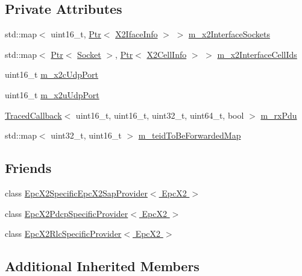 \subsection*{Private Attributes}
\begin{DoxyCompactItemize}
\item 
std\+::map$<$ uint16\+\_\+t, \hyperlink{classns3_1_1Ptr}{Ptr}$<$ \hyperlink{classns3_1_1X2IfaceInfo}{X2\+Iface\+Info} $>$ $>$ \hyperlink{classns3_1_1EpcX2_a0665276228b9b99a52ef6d5e9bdb306d}{m\+\_\+x2\+Interface\+Sockets}
\item 
std\+::map$<$ \hyperlink{classns3_1_1Ptr}{Ptr}$<$ \hyperlink{classns3_1_1Socket}{Socket} $>$, \hyperlink{classns3_1_1Ptr}{Ptr}$<$ \hyperlink{classns3_1_1X2CellInfo}{X2\+Cell\+Info} $>$ $>$ \hyperlink{classns3_1_1EpcX2_ac2a7cd7a712f47a9f429254842762482}{m\+\_\+x2\+Interface\+Cell\+Ids}
\item 
uint16\+\_\+t \hyperlink{classns3_1_1EpcX2_aa2fe730659f6fc10fcd8c44272f96dde}{m\+\_\+x2c\+Udp\+Port}
\item 
uint16\+\_\+t \hyperlink{classns3_1_1EpcX2_aa0e3b62bf699a12b65309cb25f232974}{m\+\_\+x2u\+Udp\+Port}
\item 
\hyperlink{classns3_1_1TracedCallback}{Traced\+Callback}$<$ uint16\+\_\+t, uint16\+\_\+t, uint32\+\_\+t, uint64\+\_\+t, bool $>$ \hyperlink{classns3_1_1EpcX2_a00f11080fe6a1d7020bfae006445eb59}{m\+\_\+rx\+Pdu}
\item 
std\+::map$<$ uint32\+\_\+t, uint16\+\_\+t $>$ \hyperlink{classns3_1_1EpcX2_a18b54cbbfdd1a869ce3c504274294ab6}{m\+\_\+teid\+To\+Be\+Forwarded\+Map}
\end{DoxyCompactItemize}
\subsection*{Friends}
\begin{DoxyCompactItemize}
\item 
class \hyperlink{classns3_1_1EpcX2_a5fa3eadb39e71e0c9f7a469a8315c690}{Epc\+X2\+Specific\+Epc\+X2\+Sap\+Provider$<$ Epc\+X2 $>$}
\item 
class \hyperlink{classns3_1_1EpcX2_a372bb6d7b4f9b08802172b6cf02ecd2d}{Epc\+X2\+Pdcp\+Specific\+Provider$<$ Epc\+X2 $>$}
\item 
class \hyperlink{classns3_1_1EpcX2_ad723f727ad6075fde297057b65793220}{Epc\+X2\+Rlc\+Specific\+Provider$<$ Epc\+X2 $>$}
\end{DoxyCompactItemize}
\subsection*{Additional Inherited Members}


